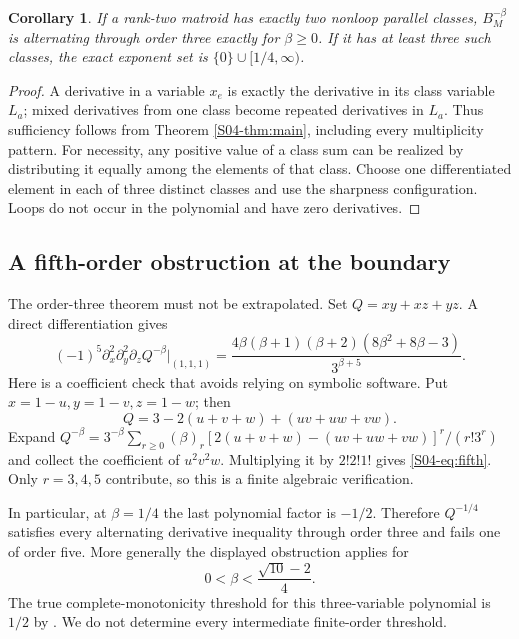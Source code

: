 \documentclass[11pt,a4paper]{article}
\newtheorem{corollary}[theorem]{Corollary}
\theoremstyle{definition}\newtheorem{definition}[theorem]{Definition}
\theoremstyle{remark}\newtheorem{remark}[theorem]{Remark}
\numberwithin{equation}{section}
\begin{document}
\begin{corollary}\label{S04-cor:ranktwo}
If a rank-two matroid has exactly two nonloop parallel classes, $B_M^{-\beta}$ is alternating through order three exactly for $\beta\ge0$. If it has at least three such classes, the exact exponent set is $\{0\}\cup[1/4,\infty)$.
\end{corollary}
\begin{proof}
A derivative in a variable $x_e$ is exactly the derivative in its class variable $L_a$; mixed derivatives from one class become repeated derivatives in $L_a$. Thus sufficiency follows from Theorem \ref{S04-thm:main}, including every multiplicity pattern. For necessity, any positive value of a class sum can be realized by distributing it equally among the elements of that class. Choose one differentiated element in each of three distinct classes and use the sharpness configuration. Loops do not occur in the polynomial and have zero derivatives.
\end{proof}

\subsection{A fifth-order obstruction at the boundary}\label{S04-sec-5}
The order-three theorem must not be extrapolated. Set $Q=xy+xz+yz$. A direct differentiation gives
\begin{equation}\label{S04-eq:fifth}
 (-1)^5\partial_x^2\partial_y^2\partial_z Q^{-\beta}\big|_{(1,1,1)}
 =\frac{4\beta(\beta+1)(\beta+2)(8\beta^2+8\beta-3)}{3^{\beta+5}}.
\end{equation}
Here is a coefficient check that avoids relying on symbolic software. Put $x=1-u,y=1-v,z=1-w$; then
\[
 Q=3-2(u+v+w)+(uv+uw+vw).
\]
Expand $Q^{-\beta}=3^{-\beta}\sum_{r\ge0}(\beta)_r[2(u+v+w)-(uv+uw+vw)]^r/(r!3^r)$ and collect the coefficient of $u^2v^2w$. Multiplying it by $2!2!1!$ gives \eqref{S04-eq:fifth}. Only $r=3,4,5$ contribute, so this is a finite algebraic verification.

In particular, at $\beta=1/4$ the last polynomial factor is $-1/2$. Therefore $Q^{-1/4}$ satisfies every alternating derivative inequality through order three and fails one of order five. More generally the displayed obstruction applies for
\[
 0<\beta<\frac{\sqrt{10}-2}{4}.
\]
The true complete-monotonicity threshold for this three-variable polynomial is $1/2$ by \cite[Proposition 3.8]{ref005}. We do not determine every intermediate finite-order threshold.
\end{document}
